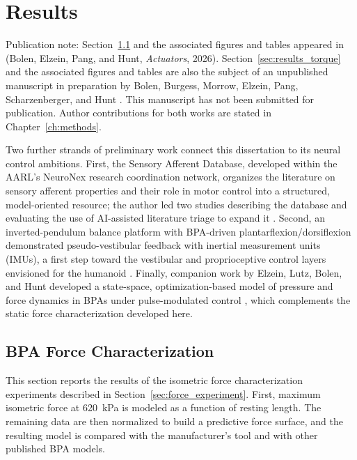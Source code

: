 \chapter{Results}\label{ch:results}

{\doublespacing\normalsize\upshape
\noindent Publication note: Section~\ref{sec:results_force} and the associated figures and tables appeared in \citet{bolen_2026} (Bolen, Elzein, Pang, and Hunt, \emph{Actuators}, 2026). Section~\ref{sec:results_torque} and the associated figures and tables are also the subject of an unpublished manuscript in preparation by Bolen, Burgess, Morrow, Elzein, Pang, Scharzenberger, and Hunt \citep{bolen_isometric_2025}. This manuscript has not been submitted for publication. Author contributions for both works are stated in Chapter~\ref{ch:methods}.\par}

Two further strands of preliminary work connect this dissertation to its neural control ambitions. First, the Sensory Afferent Database, developed within the AARL's NeuroNex research coordination network, organizes the literature on sensory afferent properties and their role in motor control into a structured, model-oriented resource; the author led two studies describing the database and evaluating the use of AI-assisted literature triage to expand it \citep{bolen_sensory_2023, bolen_using_2024}. Second, an inverted-pendulum balance platform with BPA-driven plantarflexion/dorsiflexion demonstrated pseudo-vestibular feedback with inertial measurement units (IMUs), a first step toward the vestibular and proprioceptive control layers envisioned for the humanoid \citep{bolen_balance_2024, bolen_selfbalancing_2024, bolen_selfbalancing_srs_2024}. Finally, companion work by Elzein, Lutz, Bolen, and Hunt developed a state-space, optimization-based model of pressure and force dynamics in BPAs under pulse-modulated control \citep{elzein_pressure_2025}, which complements the static force characterization developed here.

\section{BPA Force Characterization}\label{sec:results_force}

This section reports the results of the isometric force characterization experiments described in Section~\ref{sec:force_experiment}. First, maximum isometric force at \qty{620}{\kPa} is modeled as a function of resting length. The remaining data are then normalized to build a predictive force surface, and the resulting model is compared with the manufacturer's tool and with other published BPA models.



